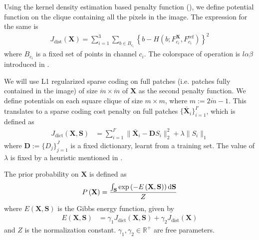 Using the kernel density estimation based penalty function (), we define potential function on the clique containing all the pixels in the image. The expression for the same is
\begin{align}
J_\text{dist}(\mathbf{X}) = \sum_{i=1}^{3} \sum_{b \in B_{c_i}} \left\lbrace b - H \left( b; F^\mathbf{X}_{c_i}, F^\text{ref}_{c_i} \right) \right\rbrace^2 \label{eqn:cost_kde}
\end{align}
where $B_{c_i}$ is a fixed set of points in channel $c_i$. The colorspace of operation is $l\alpha\beta$ introduced in .

We will use L1 regularized sparse coding on full patches (i.e. patches fully contained in the image) of size $\acute{m} \times \acute{m}$ of $\mathbf{X}$ as the second penalty function. We define potentials on each square clique of size $m \times m$, where $m := 2\acute{m} - 1$. This translates to a sparse coding cost penalty on full patches $\lbrace \mathbf{\bar X}_i \rbrace_{i=1}^{I'}$, which is defined as
\begin{align}
    J_\text{dict} \left( \mathbf{X}, \mathbf{S} \right) &= \sum_{i=1}^{I'} \| \mathbf{\bar X}_i - \mathbf{D} S_i \|_2^2 + \lambda \| S_i \|_1 \label{eqn:dictCost}
\end{align}
where $\mathbf{D} := \lbrace D_j \rbrace_{j=1}^{J}$ is a fixed dictionary, learnt from a training set. The value of $\lambda$ is fixed by a heuristic mentioned in \cite{mairal2009online}.

The prior probability on $\mathbf{X}$ is defined as 
\begin{align}
    P\left( \mathbf{X} \right) = \frac{\int_{\mathbf{S}} \exp \left( -E\left(\mathbf{X}, \mathbf{S} \right) \right) \mathop{}\!\mathrm{d} \mathbf{S}}{Z}
\end{align}
where $E \left(\mathbf{X}, \mathbf{S} \right)$ is the Gibbs energy function, given by
\begin{align}
    E \left(\mathbf{X}, \mathbf{S} \right) &= \gamma_1 J_\text{dict} \left( \mathbf{X}, \mathbf{S} \right) + \gamma_2 J_\text{dist} \left( \mathbf{X} \right)
\end{align}
and $Z$ is the normalization constant. $\gamma_1, \gamma_2 \in \mathbb{R}^+$ are free parameters.

